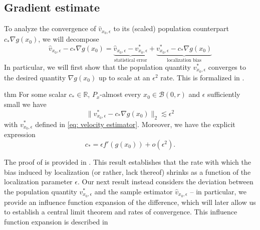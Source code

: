 \documentclass[11pt]{article}
\begin{document}
\subsection{Gradient estimate} \label{sec: velocity results presentation}

To analyze the convergence of $\hat v_{x_0, \epsilon}$ to its (scaled) population counterpart $c_*\nabla g(x_0)$, we will decompose
\[\hat v_{x_0, \epsilon} - c_* \nabla g(x_0) = \underbrace{\hat v_{x_0, \epsilon} - v^*_{x_0, \epsilon}}_{\text{statistical error}} + \underbrace{v^*_{x_0, \epsilon} - c_* \nabla g(x_0)}_{\text{localization bias}} \]
In particular, we will first show that the population quantity $v^*_{x_0, \epsilon}$ converges to the desired quantity $\nabla g(x_0)$ up to scale at an $\epsilon^2$ rate. This is formalized in .

\begin{restatable}{thm}{}\label{thm: population prop}
    For some scalar $c_* \in \mathbb{R}$, $P_x$-almost every $x_0 \in \mathcal{B}(0, r)$ and $\epsilon$ sufficiently small we have 
    \[\|v^*_{x_0, \epsilon} - c_*\nabla g(x_0)\|_2 \lesssim \epsilon^2\]
    with $v^*_{x_0, \epsilon}$ defined in \cref{eq: velocity estimator}. Moreover, we have the explicit expression
    \[c_* = \epsilon f'(g(x_0))+ o(\epsilon^2).\]
\end{restatable}

The proof of  is provided in . This result establishes that the rate with which the bias induced by localization (or rather, lack thereof) shrinks as a function of the localization parameter $\epsilon$. Our next result instead considers the deviation between the population quantity $v^*_{x_0, \epsilon}$ and the sample estimator $\hat v_{x_0, \epsilon}$ -- in particular, we provide an influence function expansion of the difference, which will later allow us to establish a central limit theorem and rates of convergence. This influence function expansion is described in 
\end{document}
